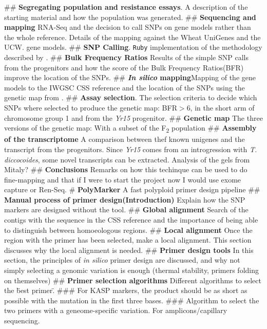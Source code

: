 \documentclass[12pt,a4paper]{book}
\begin{document}
\begin{easylist}
	## \textbf{Segregating population and resistance essays}. A description of the starting material and how the population was generated.  
	## \textbf{Sequencing and mapping} RNA-Seq and the decision to call SNPs on gene models rather than the whole reference.  Details of the mapping against the Wheat UniGenes \cite{PontiusJUWagnerL2002} and the UCW. \cite{Krasileva2013} gene models.  
	## \textbf{SNP Calling}. \verb|Ruby| implementation of the methodology described by \citet{Trick2012}. 
	## \textbf{Bulk Frequency Ratios} Results of the simple SNP calls from the progenitors and how the score of the Bulk Frequency Ratios(BFR) improve the location of the SNPs. 
	## \textbf{\textit{In silico} mapping}Mapping of the gene models to the IWGSC CSS \cite{Mayer2014} reference and the location of the SNPs using the genetic map from \citet{Wang2014}.
	## \textbf{Assay selection}. The selection criteria to decide which SNPs where selected to produce the genetic map: BFR$>$6, in the short arm of chromosome group 1 and from the \textit{Yr15} progenitor.
	## \textbf{Genetic map} The three versions of the genetic map: With a subset of the F\textsubscript{2} population
	## \textbf{Assembly of the transcriptome} A comparison between thef known unigenes and the transcript from the progenitors. Since \textit{Yr15} comes from an introgression with \textit{T. diccocoides}, some novel transcripts can be extracted. Analysis of the gels from Mitaly? 
	## \textbf{Conclusions} Remarks on how this techinque can be used to do fine-mapping and that if I were to start the project now I would  use exome capture or Ren-Seq. 
	# \textbf{PolyMarker} A fast polyploid primer design pipeline
	## \textbf{Manual process of primer design(Introduction)} Explain how the SNP markers are designed without the tool. 
	## \textbf{Global alignment} Search of the contigs with the sequence in the CSS reference and the importance of being able to distinguish between homoeologous regions. 
	## \textbf{Local alignment} Once the region with the primer has been selected, make a local alignment. This section discusses why the local alignment is needed. 
	## \textbf{Primer design tools} In this section, the principles of \textit{in silico} primer design are discussed, and why not simply selecting a genomic variation is enough (thermal stability, primers folding on themselves)
	## \textbf{Primer selection algorithms} Different algorithms to select the \"best primer\". 
	### For KASP markers, the product should be as short as possible with the mutation in the first three bases. 
	###  Algorithm to select the two primers with a geneome-specific variation. For amplicons/capillary sequencing. 

\end{easylist}
\end{document}
